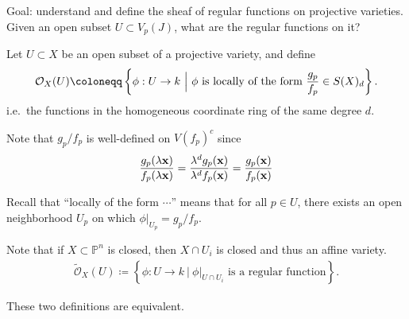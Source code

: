 Goal: understand and define the sheaf of regular functions on projective
varieties. Given an open subset \(U\subset V_p(J)\), what are the
regular functions on it?

\begin{definition}

Let \(U\subset X\) be an open subset of a projective variety, and define
\begin{align*}  
{\mathcal{O}}_X(U) \coloneqq\left\{{\phi:U\to k {~\mathrel{\Big|}~}\phi \text{ is locally of the form }   {g_p \over f_p} \in S(X)_d }\right\}
.\end{align*}
i.e.~the functions in the homogeneous coordinate ring of the same degree
\(d\).

\end{definition}

\begin{remark}

Note that \(g_p/f_p\) is well-defined on \(V(f_p)^c\) since
\begin{align*}  
{ g_p(\lambda \mathbf{x}) \over  f_p(\lambda \mathbf{x})} 
= { \lambda^d g_p(\mathbf{x}) \over \lambda^d f_p(\mathbf{x}) }
= {g_p(\mathbf{x}) \over f_p (\mathbf{x})}
\end{align*}

\end{remark}

Recall that ``locally of the form \(\cdots\)'' means that for all
\(p\in U\), there exists an open neighborhood \(U_p\) on which
\({ \left.{{\phi}} \right|_{{U_p}} } = g_p / f_p\).

\begin{definition}

Note that if \(X\subset {\mathbb{P}}^n\) is closed, then \(X\cap U_i\)
is closed and thus an affine variety.
\begin{align*}  
\tilde {\mathcal{O}}_X(U) \coloneqq\left\{{\phi: U\to k {~\mathrel{\Big|}~}{ \left.{{\phi}} \right|_{{U\cap U_i}} } \text{ is a regular function} }\right\}
.\end{align*}

\end{definition}

\begin{proposition}[?]

These two definitions are equivalent.

\end{proposition}

